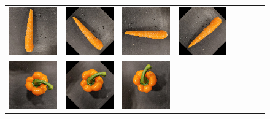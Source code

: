 \begin{figure}[tp]
\begin{center}
\begin{tabular}{c|ccccccc}
			\includegraphics[scale=0.4]{./img/carrot_4.png} &
			\includegraphics[scale=0.4]{./img/carrot_5.png} &
			\includegraphics[scale=0.4]{./img/carrot_6.png} &
			\includegraphics[scale=0.4]{./img/carrot_7.png} \\
			\includegraphics[scale=0.4]{./img/pepper_0.png} &
			\includegraphics[scale=0.4]{./img/pepper_1.png} &
			\includegraphics[scale=0.4]{./img/pepper_2.png} &

\end{tabular}
\end{center}
\end{figure}
